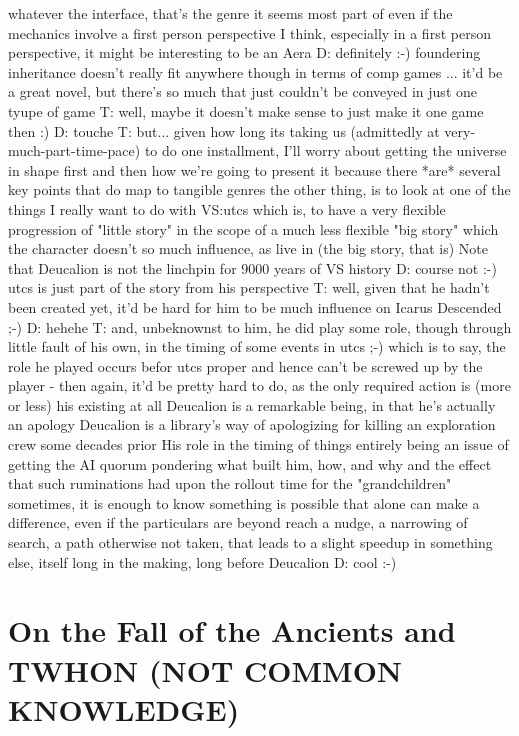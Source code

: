 whatever the interface, that's the genre it seems most part of
even if the mechanics involve a first person perspective
I think, especially in a first person perspective, it might be interesting to be an Aera
D: definitely :-)
foundering inheritance doesn't really fit anywhere though in terms of comp games ... it'd be a great novel, but there's so much that just couldn't be conveyed in just one tyupe of game
T: well, maybe it doesn't make sense to just make it one game then :)
D: touche
T: but... given how long its taking us (admittedly at very-much-part-time-pace)
to do one installment, I'll worry about getting the universe in shape first
and then how we're going to present it
because there *are* several key points that do map to tangible genres
the other thing, is to look at one of the things I really want to do with VS:utcs
which is, to have a very flexible progression of "little story" in the scope of a much less flexible "big story"
which the character doesn't so much influence, as live in (the big story, that is)
Note that Deucalion is not the linchpin for 9000 years of VS history
D: course not :-)
utcs is just part of the story from his perspective
T: well, given that he hadn't been created yet, it'd be hard for him to be much influence on Icarus Descended ;-)
D: hehehe
T: and, unbeknownst to him, he did play some role, though through little fault of his own, in the timing of some events in utcs ;-)
which is to say, the role he played occurs befor utcs proper
and hence can't be screwed up by the player - then again, it'd be pretty hard to do, as the only required action is (more or less) his existing at all 
Deucalion is a remarkable being, in that he's actually an apology
Deucalion is a library's way of apologizing for killing an exploration crew some decades prior
His role in the timing of things entirely being an issue of getting the AI quorum pondering what built him, how, and why
and the effect that such ruminations had upon the rollout time for the "grandchildren"
sometimes, it is enough to know something is possible
that alone can make a difference, even if the particulars are beyond reach
a nudge, a narrowing of search, a path otherwise not taken, that leads to a slight speedup in something else, itself long in the making, long before Deucalion
D: cool :-)


\section{On the Fall of the Ancients and TWHON (NOT COMMON KNOWLEDGE)}

